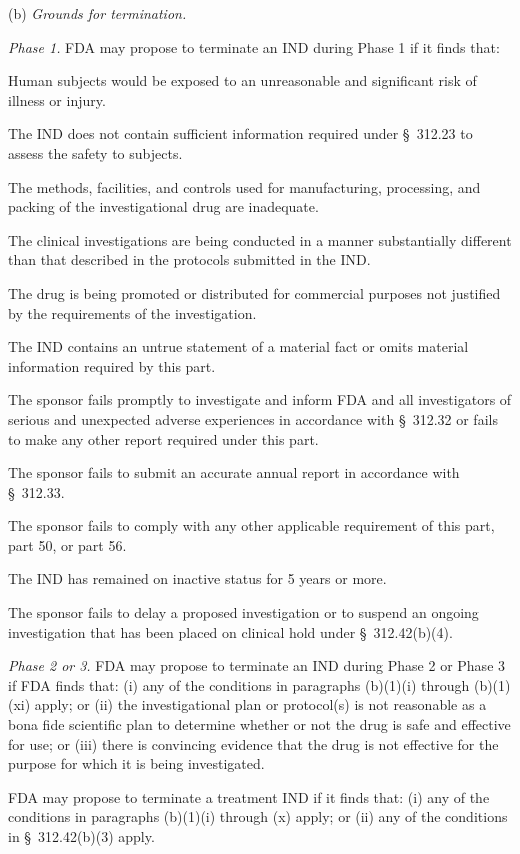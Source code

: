 \documentclass[11pt]{article}
\begin{document}
(b) \textit{Grounds for termination.}

\begin{description}[leftmargin=0.5cm,style=sameline]
\item[(1)] \textit{Phase 1.} FDA may propose to terminate an IND during Phase 1 if it finds that:
\begin{description}[leftmargin=0.8cm,style=sameline]
\item[(i)] Human subjects would be exposed to an unreasonable and significant risk of illness or injury.
\item[(ii)] The IND does not contain sufficient information required under \S~312.23 to assess the safety to subjects.
\item[(iii)] The methods, facilities, and controls used for manufacturing, processing, and packing of the investigational drug are inadequate.
\item[(iv)] The clinical investigations are being conducted in a manner substantially different than that described in the protocols submitted in the IND.
\item[(v)] The drug is being promoted or distributed for commercial purposes not justified by the requirements of the investigation.
\item[(vi)] The IND contains an untrue statement of a material fact or omits material information required by this part.
\item[(vii)] The sponsor fails promptly to investigate and inform FDA and all investigators of serious and unexpected adverse experiences in accordance with \S~312.32 or fails to make any other report required under this part.
\item[(viii)] The sponsor fails to submit an accurate annual report in accordance with \S~312.33.
\item[(ix)] The sponsor fails to comply with any other applicable requirement of this part, part 50, or part 56.
\item[(x)] The IND has remained on inactive status for 5 years or more.
\item[(xi)] The sponsor fails to delay a proposed investigation or to suspend an ongoing investigation that has been placed on clinical hold under \S~312.42(b)(4).
\end{description}

\item[(2)] \textit{Phase 2 or 3.} FDA may propose to terminate an IND during Phase 2 or Phase 3 if FDA finds that: (i) any of the conditions in paragraphs (b)(1)(i) through (b)(1)(xi) apply; or (ii) the investigational plan or protocol(s) is not reasonable as a bona fide scientific plan to determine whether or not the drug is safe and effective for use; or (iii) there is convincing evidence that the drug is not effective for the purpose for which it is being investigated.

\item[(3)] FDA may propose to terminate a treatment IND if it finds that: (i) any of the conditions in paragraphs (b)(1)(i) through (x) apply; or (ii) any of the conditions in \S~312.42(b)(3) apply.
\end{description}
\end{document}
